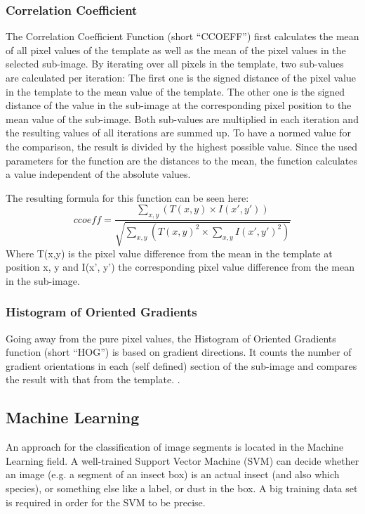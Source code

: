 \subsubsection{Correlation Coefficient}
The Correlation Coefficient Function (short ``CCOEFF'') first calculates the mean of all pixel values of the template as well as the mean of the pixel values in the selected sub-image.
By iterating over all pixels in the template, two sub-values are calculated per iteration:
The first one is the signed distance of the pixel value in the template to the mean value of the template.
The other one is the signed distance of the value in the sub-image at the corresponding pixel position to the mean value of the sub-image.
Both sub-values are multiplied in each iteration and the resulting values of all iterations are summed up.
To have a normed value for the comparison, the result is divided by the highest possible value.
Since the used parameters for the function are the distances to the mean, the function calculates a value independent of the absolute values.

The resulting formula for this function can be seen here:
\[ccoeff = \frac{\sum_{x,y} (T(x,y) \times I(x',y'))}{\sqrt{\sum_{x,y} (T(x,y)^2 \times \sum_{x,y} I(x',y')^2)}} \]
Where T(x,y) is the pixel value difference from the mean in the template at position x, y and I(x', y') the corresponding pixel value difference from the mean in the sub-image.

\subsubsection{Histogram of Oriented Gradients}
Going away from the pure pixel values, the Histogram of Oriented Gradients function (short ``HOG'') is based on gradient directions.
It counts the number of gradient orientations in each (self defined) section of the sub-image and compares the result with that from the template.
\cite{hog_function}.

\subsection{Machine Learning}
An approach for the classification of image segments is located in the Machine Learning field.
A well-trained Support Vector Machine (SVM) \cite{svm} can decide whether an image (e.g. a segment of an insect box) is an actual insect (and also which species), or something else like a label, or dust in the box.
A big training data set is required in order for the SVM to be precise.

